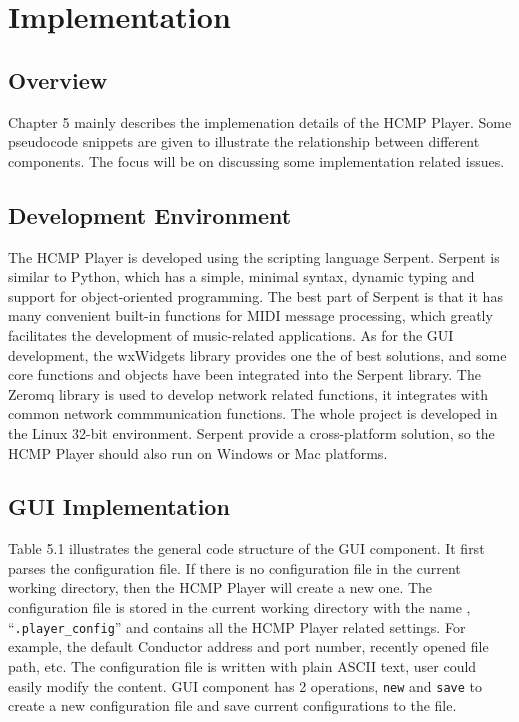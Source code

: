 
\chapter{Implementation} %



\ifpdf
    \graphicspath{{X/figures/PNG/}{X/figures/PDF/}{X/figures/}}
\else
    \graphicspath{{X/figures/EPS/}{X/figures/}}
\fi

\section{Overview}
Chapter 5 mainly describes the implemenation details of the HCMP Player. Some
pseudocode snippets are given to illustrate the relationship between 
different components. The focus will be on discussing some implementation 
related issues. 

\section{Development Environment}

The HCMP Player is developed using the scripting language Serpent\cite{Serpent}. 
Serpent is similar to Python, which has a simple, 
minimal syntax, dynamic typing and support for object-oriented programming. 
The best part of Serpent is 
that it has many convenient built-in functions for MIDI message processing, 
which greatly facilitates the development of music-related applications. 
As for the GUI development, the wxWidgets \cite{wxWidget} library provides one 
the of best solutions, and some core functions and objects have been 
integrated into the Serpent library. The Zeromq library is used to develop 
network related functions, it integrates with common network commmunication 
functions. The whole project is developed in the Linux 32-bit environment. 
Serpent provide a cross-platform solution, so the HCMP Player should also 
run on Windows or Mac platforms.

\section{GUI Implementation}
Table 5.1 illustrates the general code structure of the GUI component. 
It first parses the configuration file. If there is no configuration file 
in the current working directory, then the HCMP Player will create a new one.
The configuration file is stored in the current working directory with 
the name , ``\texttt{.player\_config}'' and contains all the HCMP Player  
related settings. For example, the default Conductor address and 
port number, recently opened file path, etc. The configuration file is written 
with plain ASCII text, user could easily modify the content. GUI 
component has 2 operations, \texttt{new} and \texttt{save} to create a new 
configuration file and save current configurations to the file.

